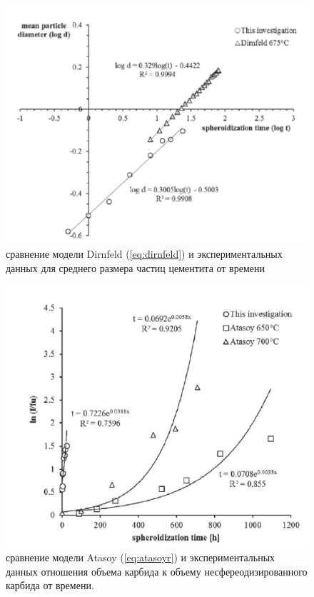 \documentclass[a4paper, 14pt]{article}
\begin{document}
	\begin{figure}[h!]
	\centering
	\includegraphics[scale=0.35]{images/dirnfeld}
	\caption{сравнение модели Dirnfeld (\ref{eq:dirnfeld}) и экспериментальных данных для среднего размера частиц цементита от времени}
	\end{figure}

	\begin{figure}[h!]
		\centering
		\includegraphics[scale=0.55]{images/fu}
		\caption{сравнение модели Atasoy (\ref{eq:atasoyr}) и экспериментальных данных отношения объема карбида к объему несфереодизированного карбида от времени. }
	\end{figure}
	
\end{document}
